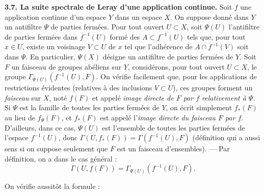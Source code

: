 \indent\textbf{3.7. La suite spectrale de Leray d'une application continue.} Soit
$f$ une application continue d'un espace $Y$ dans un espace $X$.
On suppose donné dans $Y$ un antifiltre $\Psi$ de parties fermées. Pour tout
ouvert $U\subset X$, soit $\Psi(U)$ l'antifiltre de parties fermées dans
$f^{-1}(U)$ formé des $A\subset f^{-1}(U)$ tels que, pour tout $x\in U$,
existe un voisinage $V\subset U$ de $x$ tel que l'adhérence de
$A\cap f^{-1}(V)$ soit dans $\Psi$. En particulier, $\Psi(X)$ désigne un
antifiltre de parties fermées de $Y$.
Soit $F$ un faisceau de groupes abéliens sur $Y$, considérons, pour tout ouvert
$U\subset X$, le groupe $\Gamma_{\Psi(U)}(f^{-1}(U),F)$. On vérifie facilement
que, pour les applications de restrictions évidentes (relatives à des
inclusions $V\subset U$), ces groupes forment un \textit{faisceau} sur $X$, noté
$f(F)$ et appelé \textit{image directe de $F$ par $f$ relativement à
$\Psi$}.
Si $\Psi$ est la famille de toutes les parties fermées de $Y$, on écrit
simplement $f_*(F)$ au lieu de $f_\Psi(F)$, et $f_*(F)$ est appelé
l'\textit{image directe du faisceau $F$ par $f$}. D'ailleurs, dans ce cas,
$\Psi(U)$ est l'ensemble de toutes les parties fermées de l'espace
$f^{-1}(U)$, donc
$\Gamma(U,f_*(F))=\Gamma(f^{-1}(U),F)$
(définition qui a aussi sens si on suppose seulement que $F$ est un faisceau
d'ensembles). --- Par définition, on a dans le cas général :
\[
\Gamma(U,f(F))=\Gamma_{\Psi(U)}(f^{-1}(U),F).
\]

On vérifie aussitôt la formule :

